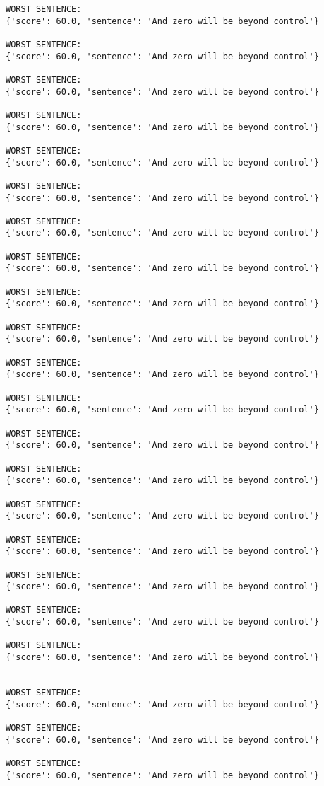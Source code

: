 \documentclass[12pt,a4paper,oneside]{book}
\begin{document}
\begin{verbatim}
WORST SENTENCE:
{'score': 60.0, 'sentence': 'And zero will be beyond control'}

WORST SENTENCE:
{'score': 60.0, 'sentence': 'And zero will be beyond control'}

WORST SENTENCE:
{'score': 60.0, 'sentence': 'And zero will be beyond control'}

WORST SENTENCE:
{'score': 60.0, 'sentence': 'And zero will be beyond control'}

WORST SENTENCE:
{'score': 60.0, 'sentence': 'And zero will be beyond control'}

WORST SENTENCE:
{'score': 60.0, 'sentence': 'And zero will be beyond control'}

WORST SENTENCE:
{'score': 60.0, 'sentence': 'And zero will be beyond control'}

WORST SENTENCE:
{'score': 60.0, 'sentence': 'And zero will be beyond control'}

WORST SENTENCE:
{'score': 60.0, 'sentence': 'And zero will be beyond control'}

WORST SENTENCE:
{'score': 60.0, 'sentence': 'And zero will be beyond control'}

WORST SENTENCE:
{'score': 60.0, 'sentence': 'And zero will be beyond control'}

WORST SENTENCE:
{'score': 60.0, 'sentence': 'And zero will be beyond control'}

WORST SENTENCE:
{'score': 60.0, 'sentence': 'And zero will be beyond control'}

WORST SENTENCE:
{'score': 60.0, 'sentence': 'And zero will be beyond control'}

WORST SENTENCE:
{'score': 60.0, 'sentence': 'And zero will be beyond control'}

WORST SENTENCE:
{'score': 60.0, 'sentence': 'And zero will be beyond control'}

WORST SENTENCE:
{'score': 60.0, 'sentence': 'And zero will be beyond control'}

WORST SENTENCE:
{'score': 60.0, 'sentence': 'And zero will be beyond control'}

WORST SENTENCE:
{'score': 60.0, 'sentence': 'And zero will be beyond control'}
 
 
WORST SENTENCE:
{'score': 60.0, 'sentence': 'And zero will be beyond control'}

WORST SENTENCE:
{'score': 60.0, 'sentence': 'And zero will be beyond control'}

WORST SENTENCE:
{'score': 60.0, 'sentence': 'And zero will be beyond control'}


\end{verbatim}
\end{document}
